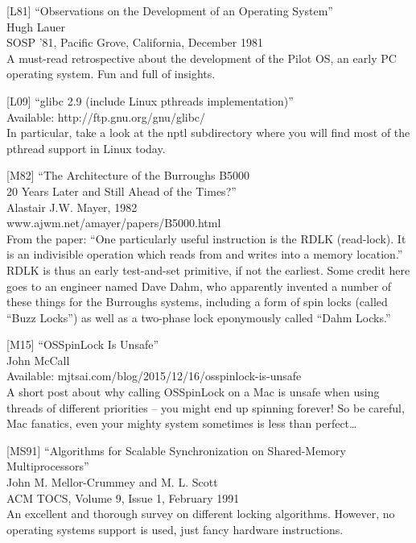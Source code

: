 {[}L81{]} ``Observations on the Development of an Operating System''\\
Hugh Lauer\\
SOSP '81, Pacific Grove, California, December 1981\\
A must-read retrospective about the development of the Pilot OS, an
early PC operating system. Fun and full of insights.

{[}L09{]} ``glibc 2.9 (include Linux pthreads implementation)''\\
Available: http://ftp.gnu.org/gnu/glibc/\\
In particular, take a look at the nptl subdirectory where you will find
most of the pthread support in Linux today.

{[}M82{]} ``The Architecture of the Burroughs B5000\\
20 Years Later and Still Ahead of the Times?''\\
Alastair J.W. Mayer, 1982\\
www.ajwm.net/amayer/papers/B5000.html\\
From the paper: ``One particularly useful instruction is the RDLK
(read-lock). It is an indivisible operation which reads from and writes
into a memory location.'' RDLK is thus an early test-and-set primitive,
if not the earliest. Some credit here goes to an engineer named Dave
Dahm, who apparently invented a number of these things for the Burroughs
systems, including a form of spin locks (called ``Buzz Locks'') as well
as a two-phase lock eponymously called ``Dahm Locks.''

{[}M15{]} ``OSSpinLock Is Unsafe''\\
John McCall\\
Available: mjtsai.com/blog/2015/12/16/osspinlock-is-unsafe\\
A short post about why calling OSSpinLock on a Mac is unsafe when using
threads of different priorities -- you might end up spinning forever! So
be careful, Mac fanatics, even your mighty system sometimes is less than
perfect\ldots{}

{[}MS91{]} ``Algorithms for Scalable Synchronization on Shared-Memory
Multiprocessors''\\
John M. Mellor-Crummey and M. L. Scott\\
ACM TOCS, Volume 9, Issue 1, February 1991\\
An excellent and thorough survey on different locking algorithms.
However, no operating systems support is used, just fancy hardware
instructions.

